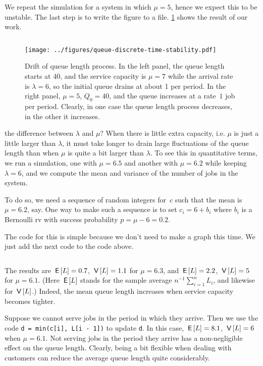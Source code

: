 \documentclass[stochastic-or.tex]{subfiles}
\begin{document}
We repeat the simulation for a system in which $\mu=5$, hence we expect this to be unstable.
The last step is to write the figure to a file.
\cref{fig:drift} shows the result of our work.
\inputminted[firstline=61, lastline=73]{python}{../code/discrete_simulations.py} %


\begin{figure}[t]
\centering
\texttt{[image: ../figures/queue-discrete-time-stability.pdf]}
\caption{Drift of queue length process.
In the left panel, the queue length starts at 40, and the service capacity is $\mu=7$ while the arrival rate is $\lambda=6$, so the initial queue drains at about 1 per period.
In the right panel, $\mu=5$, $Q_{0}=40$, and the queue increases at a rate~$1$ job per period.
Clearly, in one case the queue length process decreases, in the other it increases.}
\label{fig:drift}
\end{figure}

 the difference between $\lambda$ and $\mu$?
When there is little extra capacity, i.e.
$\mu$ is just a little larger than $\lambda$, it must take longer to drain large fluctuations of the queue length than when $\mu$ is quite a bit larger than $\lambda$.
To see this in quantitative terms, we run a simulation, one with $\mu=6.5$ and another with $\mu=6.2$ while keeping $\lambda=6$, and we compute the mean and variance of the number of jobs in the system.

To do so, we need a sequence of random integers for~$c$ such that the mean is $\mu=6.2$, say. One way to make such a sequence is to set $c_{i} = 6 + b_{i}$ where $b_{i}$ is a Bernoulli rv with success probability  $p=\mu - 6 = 0.2$.

The code for this is simple because we don't need to make a graph this time. We just add the next code to the code above.
\inputminted[firstline=78, lastline=87]{python}{../code/discrete_simulations.py} %
The results are $\,\mathsf{E}\left[L\right] = 0.7$, $\,\mathsf{V}\left[L\right] = 1.1$ for $\mu=6.3$, and $\,\mathsf{E}\left[L\right] = 2.2$, $\,\mathsf{V}\left[L\right] = 5$ for $\mu=6.1$.
(Here $\,\mathsf{E}\left[L\right]$ stands for the sample average $n^{-1}\sum_{i=1}^{n} L_{i}$, and likewise for $\,\mathsf{V}\left[L\right]$.)
Indeed, the mean queue length increases when service capacity becomes tighter.

Suppose we cannot serve jobs in the period in which they arrive.
Then we use the code \texttt{d = min(c[i], L[i - 1])} to update \texttt{d}.
In this case, $\,\mathsf{E}\left[L\right] = 8.1$, $\,\mathsf{V}\left[L\right] = 6$ when $\mu=6.1$.
Not serving jobs in the period they arrive has a non-negligible effect on the queue length.
Clearly, being a bit flexible when dealing with customers can reduce the average queue length quite considerably.
\end{document}
